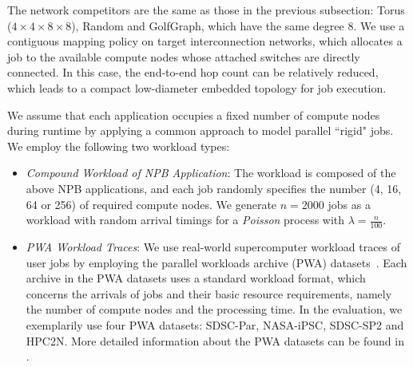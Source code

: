 \documentclass[conference]{IEEEtran}
\begin{document}
The network competitors are the same as those in the previous subsection: Torus ($4 \times 4 \times 8 \times 8$), Random and GolfGraph, which have the same degree 8.
We use a contiguous mapping policy on target interconnection networks, which allocates a job to the available compute nodes whose attached switches are directly connected. 
In this case, the end-to-end hop count can be relatively reduced, which leads to a compact low-diameter embedded topology for job execution.

We assume that each application occupies a fixed number of compute nodes during runtime by applying a common approach to model parallel ``rigid" jobs.
We employ the following two workload types:
\begin{itemize}
\item 
\emph{Compound Workload of NPB Application}: 
The workload is composed of the above NPB applications, and each job randomly specifies the number (4, 16, 64 or 256) of required compute nodes.
We generate $n = 2000$ jobs as a workload with random arrival timings for a \emph{Poisson} process with $\lambda = \frac{n}{100}$. 
\item 
\emph{PWA Workload Traces}: 
We use real-world supercomputer workload traces of user jobs by employing the parallel workloads archive (PWA) datasets~\cite{PWA}. 
Each archive in the PWA datasets uses a standard workload format, which concerns the arrivals of jobs and their basic resource requirements, namely the number of compute nodes and the processing time. 
In the evaluation, we exemplarily use four PWA datasets: SDSC-Par, NASA-iPSC, SDSC-SP2 and HPC2N.
More detailed information about the PWA datasets can be found in \cite{pwa2014}.
\end{itemize}

\ifx\allfiles\undefined
\end{document}
